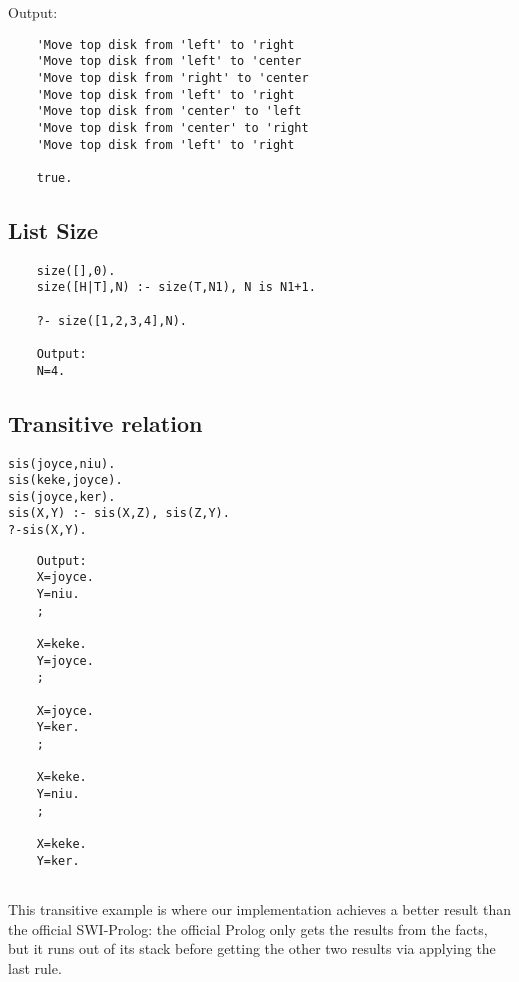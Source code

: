 \documentclass[11pt,a4paper]{report}
\begin{document}
Output:
\begin{lstlisting}
	'Move top disk from 'left' to 'right
	'Move top disk from 'left' to 'center
	'Move top disk from 'right' to 'center
	'Move top disk from 'left' to 'right
	'Move top disk from 'center' to 'left
	'Move top disk from 'center' to 'right
	'Move top disk from 'left' to 'right
	
	true.
\end{lstlisting}

\subsection*{List Size}
\begin{lstlisting}
	size([],0).
	size([H|T],N) :- size(T,N1), N is N1+1.
	
	?- size([1,2,3,4],N).
	
	Output: 
	N=4.
\end{lstlisting}



\subsection*{Transitive relation}
\begin{lstlisting}
sis(joyce,niu).
sis(keke,joyce).
sis(joyce,ker).
sis(X,Y) :- sis(X,Z), sis(Z,Y).
?-sis(X,Y).
\end{lstlisting}

\begin{lstlisting}
	Output:
	X=joyce.
	Y=niu.
	;
	
	X=keke.
	Y=joyce.
	;
	
	X=joyce.
	Y=ker.
	;
	
	X=keke.
	Y=niu.
	;
	
	X=keke.
	Y=ker.
	
\end{lstlisting}

This transitive example is where our implementation achieves a better result than the official SWI-Prolog: the official Prolog only gets the results from the facts, but it runs out of its stack before getting the other two results via applying the last rule. 
\end{document}
